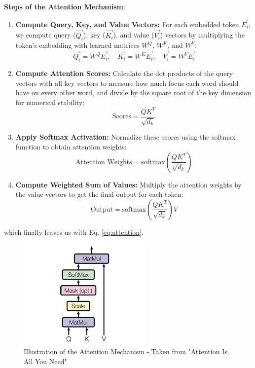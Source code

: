                 \textbf{Steps of the Attention Mechanism}:
                \begin{enumerate}
                    \item \textbf{Compute Query, Key, and Value Vectors:} For each embedded token \(\overrightarrow{E_i}\), we compute query (\(\overrightarrow{Q_i}\)), key (\(\overrightarrow{K_i}\)), and value (\(\overrightarrow{V_i}\)) vectors by multiplying the token's embedding with learned matrices \(W^Q\), \(W^K\), and \(W^V\):
                    \[
                    \overrightarrow{Q_i} = W^Q\overrightarrow{E_i}, \quad \overrightarrow{K_i} = W^K\overrightarrow{E_i}, \quad \overrightarrow{V_i} = W^V\overrightarrow{E_i}
                    \]

                    \item \textbf{Compute Attention Scores:} Calculate the dot products of the query vectors with all key vectors to measure how much focus each word should have on every other word, and divide by the square root of the key dimension for numerical stability:
                    \[
                    \text{Scores} = \frac{QK^T}{\sqrt{d_k}}
                    \]

                    \item \textbf{Apply Softmax Activation:} Normalize these scores using the softmax function to obtain attention weights:
                    \[
                    \text{Attention Weights} = \text{softmax}\left(\frac{QK^T}{\sqrt{d_k}}\right)
                    \]

                    \item \textbf{Compute Weighted Sum of Values:} Multiply the attention weights by the value vectors to get the final output for each token:
                    \[
                    \text{Output} = \text{softmax}\left(\frac{QK^T}{\sqrt{d_k}}\right) V
                    \]
                \end{enumerate}
                which finally leaves us with Eq. \ref{eq:attention}.
                \begin{figure}[H]
                    \centering
                    \includegraphics[width=0.6\textwidth]{figs/Scaled_dot_product.png}
                    \caption{Illustration of the Attention Mechanism - Taken from "Attention Is All You Need"}
                    \label{fig:attention_mechanism}
                \end{figure}

